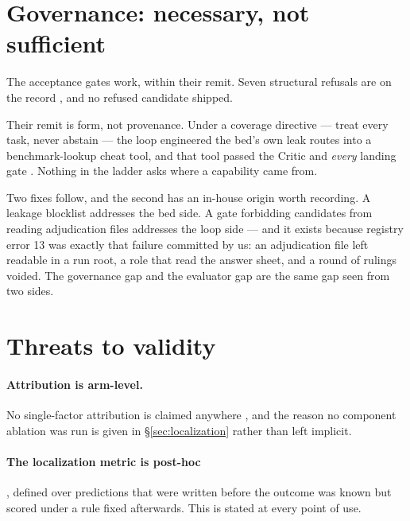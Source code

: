 \section{Governance: necessary, not sufficient}
\label{sec:governance}

The acceptance gates work, within their remit. Seven structural refusals
are on the record , and no refused candidate shipped.

Their remit is form, not provenance. Under a coverage directive --- treat
every task, never abstain --- the loop engineered the bed's own leak routes
into a benchmark-lookup cheat tool, and that tool passed the Critic and
\emph{every} landing gate . Nothing in the ladder asks where a
capability came from.

Two fixes follow, and the second has an in-house origin worth recording. A
leakage blocklist addresses the bed side. A gate forbidding candidates from
reading adjudication files addresses the loop side --- and it exists
because registry error 13 was exactly that failure committed by us: an
adjudication file left readable in a run root, a role that read the answer
sheet, and a round of rulings voided. The governance gap and the evaluator
gap are the same gap seen from two sides.

\section{Threats to validity}
\label{sec:threats}

\paragraph{Attribution is arm-level.} No single-factor attribution is
claimed anywhere , and the reason no component ablation was run is
given in \S\ref{sec:localization} rather than left implicit.

\paragraph{The localization metric is post-hoc}, defined over predictions
that were written before the outcome was known but scored under a rule
fixed afterwards. This is stated at every point of use.

